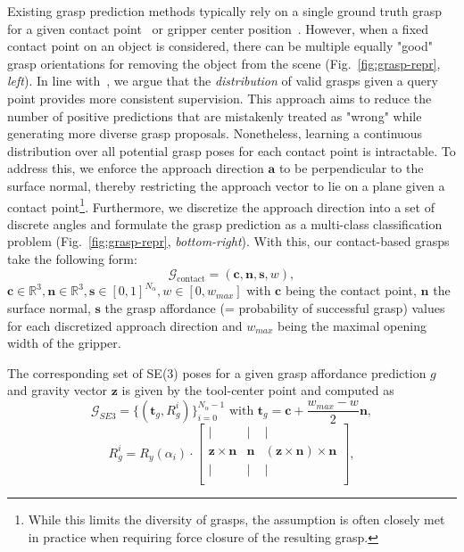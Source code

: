 \documentclass[letterpaper, 10 pt, conference]{ieeeconf}  %
\begin{document}
\label{sec:grasp-repr}
Existing grasp prediction methods typically rely on a single ground truth grasp for a given contact point~\cite{Sundermeyer2021ContactGraspNetE6} or gripper center position~\cite{Breyer2021VolumetricGN, ChavanDafle2021SimultaneousOR}. However, when a fixed contact point on an object is considered, there can be multiple equally "good" grasp orientations for removing the object from the scene (Fig.~\ref{fig:grasp-repr}, \emph{left}). In line with~\cite{huang2022edge}, we argue that the \emph{distribution} of valid grasps given a query point provides more consistent supervision. This approach aims to reduce the number of positive predictions that are mistakenly treated as "wrong" while generating more diverse grasp proposals.
Nonetheless, learning a continuous distribution over all potential grasp poses for each contact point is intractable. To address this, we enforce the approach direction $\mathbf{a}$ to be perpendicular to the surface normal, thereby restricting the approach vector to lie on a plane given a contact point\footnote{While this limits the diversity of grasps, the assumption is often closely met in practice when requiring force closure of the resulting grasp.}.
Furthermore, we discretize the approach direction into a set of discrete angles and formulate the grasp prediction as a multi-class classification problem (Fig.~\ref{fig:grasp-repr}, \emph{bottom-right}). With this, our contact-based grasps take the following form:
\begin{equation}
    \mathcal{G}_{\text{contact}} = (\mathbf{c},\mathbf{n},\mathbf{s},w) ,
\end{equation}
$\mathbf{c} \in \mathbb{R}^3, \mathbf{n} \in \mathbb{R}^3, \mathbf{s} \in [0,1]^{N_{\alpha}}, w \in [0, w_{max}]$ with $\mathbf{c}$ being the contact point, $\mathbf{n}$ the surface normal, $\mathbf{s}$ the grasp affordance (= probability of successful grasp) values for each discretized approach direction and $w_{max}$ being the maximal opening width of the gripper. 

The corresponding set of SE(3) poses for a given grasp affordance prediction $g$ and gravity vector $\mathbf{z}$ is given by the tool-center point and computed as 
\begin{equation}
    \mathcal{G}_{SE3} = \{(\mathbf{t}_g, R_g^i)\}_{i=0}^{N_\alpha-1} \text{ with }
   \mathbf{t}_g = \mathbf{c} + \frac{w_{max} - w}{2} \mathbf{n},
\end{equation}
\begin{equation}  
R_g^i = R_y(\alpha_i) \cdot \begin{bmatrix}
    | & | & | \\
     \mathbf{z} \times \mathbf{n} & \mathbf{n}  & ( \mathbf{z} \times \mathbf{n} ) \times \mathbf{n} \\
    | & | & | \\
\end{bmatrix},
\end{equation}
\end{document}
